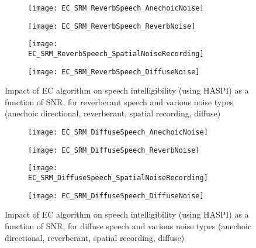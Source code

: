 \begin{figure}[H]
	\centering
	\begin{subfigure}[b]{0.49\textwidth}
		\centering
		\texttt{[image: EC\_SRM\_ReverbSpeech\_AnechoicNoise]}
	\end{subfigure}
	\hfill
	\begin{subfigure}[b]{0.49\textwidth}
		\centering
		\texttt{[image: EC\_SRM\_ReverbSpeech\_ReverbNoise]}
	\end{subfigure}
	\hfill
	\begin{subfigure}[b]{0.49\textwidth}
		\centering
		\texttt{[image: EC\_SRM\_ReverbSpeech\_SpatialNoiseRecording]}
	\end{subfigure}
	\hfill
	\begin{subfigure}[b]{0.49\textwidth}
		\centering
		\texttt{[image: EC\_SRM\_ReverbSpeech\_DiffuseNoise]}
	\end{subfigure}
	\hfill
	\caption{Impact of EC algorithm on speech intelligibility (using HASPI) as a function of SNR, for reverberant speech and various noise types (anechoic directional, reverberant, spatial recording, diffuse)}
	\label{fig:EC_SRM_ReverbSpeech}
\end{figure}


\begin{figure}[H]
	\centering
	\begin{subfigure}[b]{0.49\textwidth}
		\centering
		\texttt{[image: EC\_SRM\_DiffuseSpeech\_AnechoicNoise]}
	\end{subfigure}
	\hfill
	\begin{subfigure}[b]{0.49\textwidth}
		\centering
		\texttt{[image: EC\_SRM\_DiffuseSpeech\_ReverbNoise]}
	\end{subfigure}
	\hfill
	\begin{subfigure}[b]{0.49\textwidth}
		\centering
		\texttt{[image: EC\_SRM\_DiffuseSpeech\_SpatialNoiseRecording]}
	\end{subfigure}
	\hfill
	\begin{subfigure}[b]{0.49\textwidth}
		\centering
		\texttt{[image: EC\_SRM\_DiffuseSpeech\_DiffuseNoise]}
	\end{subfigure}
	\hfill
	\caption{Impact of EC algorithm on speech intelligibility (using HASPI) as a function of SNR, for diffuse speech and various noise types (anechoic directional, reverberant, spatial recording, diffuse)}
	\label{fig:EC_SRM_DiffuseSpeech}
\end{figure}


